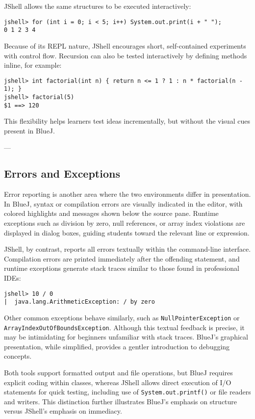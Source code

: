 \documentclass{article}
\begin{document}
JShell allows the same structures to be executed interactively:

\begin{lstlisting}
jshell> for (int i = 0; i < 5; i++) System.out.print(i + " ");
0 1 2 3 4 
\end{lstlisting}

Because of its REPL nature, JShell encourages short, self-contained experiments with control flow. Recursion can also be tested interactively by defining methods inline, for example:

\begin{lstlisting}
jshell> int factorial(int n) { return n <= 1 ? 1 : n * factorial(n - 1); }
jshell> factorial(5)
$1 ==> 120
\end{lstlisting}

This flexibility helps learners test ideas incrementally, but without the visual cues present in BlueJ.

---

\subsection{Errors and Exceptions}

Error reporting is another area where the two environments differ in presentation. In BlueJ, syntax or compilation errors are visually indicated in the editor, with colored highlights and messages shown below the source pane. Runtime exceptions such as division by zero, null references, or array index violations are displayed in dialog boxes, guiding students toward the relevant line or expression.

JShell, by contrast, reports all errors textually within the command-line interface. Compilation errors are printed immediately after the offending statement, and runtime exceptions generate stack traces similar to those found in professional IDEs:

\begin{lstlisting}
jshell> 10 / 0
|  java.lang.ArithmeticException: / by zero
\end{lstlisting}

Other common exceptions behave similarly, such as \texttt{NullPointerException} or \texttt{ArrayIndexOutOfBoundsException}. Although this textual feedback is precise, it may be intimidating for beginners unfamiliar with stack traces. BlueJ’s graphical presentation, while simplified, provides a gentler introduction to debugging concepts.

Both tools support formatted output and file operations, but BlueJ requires explicit coding within classes, whereas JShell allows direct execution of I/O statements for quick testing, including use of \texttt{System.out.printf()} or file readers and writers. This distinction further illustrates BlueJ’s emphasis on structure versus JShell’s emphasis on immediacy.
\end{document}
